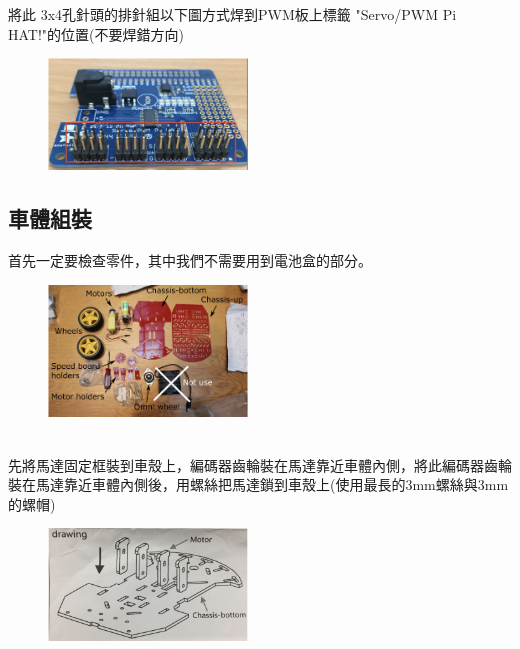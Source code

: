\documentclass{article}
\begin{document}
將此 3x4孔針頭的排針組以下圖方式焊到PWM板上標籤 "Servo/PWM Pi HAT!"的位置(不要焊錯方向)
\\
\begin{figure}[htp]
    \begin{center}
        \includegraphics[width=150pt]{pic/1_1_11.png}
    \end{center}
\end{figure}

\subsection{車體組裝}
首先一定要檢查零件，其中我們不需要用到電池盒的部分。
\\
\begin{figure}[htp]
    \begin{center}
        \includegraphics[width=150pt]{pic/1_1_12.png}
    \end{center}
\end{figure}
\\
先將馬達固定框裝到車殼上，編碼器齒輪裝在馬達靠近車體內側，將此編碼器齒輪裝在馬達靠近車體內側後，用螺絲把馬達鎖到車殼上(使用最長的3mm螺絲與3mm的螺帽)
\\
\begin{figure}[htp]
    \begin{center}
        \includegraphics[width=150pt]{pic/1_1_13.png}
    \end{center}
\end{figure}
\\
\end{document}
